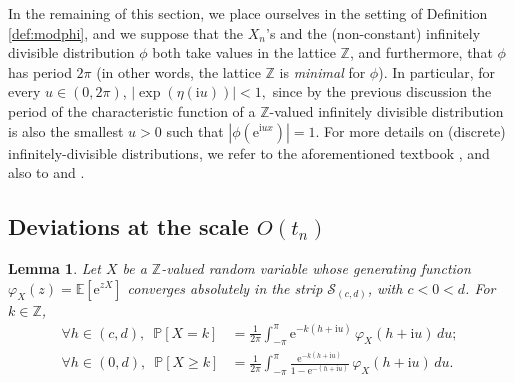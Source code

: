 \documentclass[12pt,a4paper,reqno]{amsart}
\newtheorem{lemma}{Lemma}[section]
\theoremstyle{remark}
\newcommand{\N}{\mathbb{N}}
\newcommand{\Z}{\mathbb{Z}}
\newcommand{\R}{\mathbb{R}}
\newcommand{\E}{\mathrm{e}}
\newcommand{\I}{\mathrm{i}}
\newcommand{\esper}{\mathbb{E}}
\newcommand{\proba}{\mathbb{P}}
\newcommand{\eps}{\varepsilon}
\newcommand{\supp}{\mathrm{supp}}
\begin{document}
\bigskip


In the remaining of this section, we place ourselves in the setting of Definition \ref{def:modphi}, and we suppose that the $X_{n}$'s and the (non-constant) infinitely divisible distribution $\phi$ both take values in the lattice $\Z$, and furthermore, that $\phi$ has period $2\pi$ (in other words, the lattice $\Z$ is \emph{minimal} for $\phi$). In particular, for every $u \in (0,2\pi)$,
$|\exp(\eta(\I u))|<1,$
since by the previous discussion the period of the characteristic function of a $\Z$-valued infinitely divisible distribution is also the smallest $u > 0$ such that $|\phi(\E^{\I u x})|=1$. For more details on (discrete) infinitely-divisible distributions, we refer to the aforementioned textbook \cite{SVH04}, and also to \cite{Kat67} and \cite[Chapter XVII]{Fel71}.
\bigskip



\subsection{Deviations at the scale \texorpdfstring{$O(t_{n})$}{O(tn)}} 

\begin{lemma}\label{lem:fourier}
Let $X$ be a $\Z$-valued random variable whose generating function $\varphi_{X}(z)=\esper[\E^{zX}]$ converges absolutely in the strip $\mathcal{S}_{(c,d)}$, with $c < 0 <d$. For $k \in \Z$,
\begin{align*}
\forall h \in (c,d),\,\,\,\proba[X=k]&=\frac{1}{2\pi}\int_{-\pi}^{\pi} \E^{-k(h+\I u)}\,\varphi_{X}(h + \I u)\,du;\\
\forall h \in (0,d),\,\,\,\proba[X\geq k]&=\frac{1}{2\pi}\int_{-\pi}^{\pi} \frac{\E^{-k(h+\I u)}}{1-\E^{-(h+ \I u)}}\,\varphi_{X}(h + \I u)\,du.
\end{align*}
\end{lemma}
\end{document}
